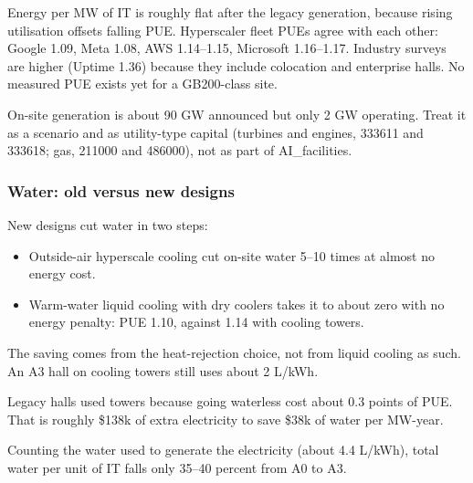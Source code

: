 Energy per MW of IT is roughly flat after the legacy generation, because rising utilisation
offsets falling PUE. Hyperscaler fleet PUEs agree with each other: Google 1.09, Meta 1.08, AWS
1.14--1.15, Microsoft 1.16--1.17. Industry surveys are higher (Uptime 1.36) because they include
colocation and enterprise halls. No measured PUE exists yet for a GB200-class site.

On-site generation is about 90 GW announced but only 2 GW operating. Treat it as a scenario and
as utility-type capital (turbines and engines, 333611 and 333618; gas, 211000 and 486000), not
as part of AI\_facilities.

\subsubsection{Water: old versus new designs}

\begin{table}[ht]\centering\small
\caption{Water per MW of IT load}\label{tab:water}
\end{table}

New designs cut water in two steps:
\begin{itemize}
  \item Outside-air hyperscale cooling cut on-site water 5--10 times at almost no energy cost.
  \item Warm-water liquid cooling with dry coolers takes it to about zero with no energy
    penalty: PUE 1.10, against 1.14 with cooling towers.
\end{itemize}
The saving comes from the heat-rejection choice, not from liquid cooling as such. An A3 hall on
cooling towers still uses about 2 L/kWh.

Legacy halls used towers because going waterless cost about 0.3 points of PUE. That is roughly
\$138k of extra electricity to save \$38k of water per MW-year.

Counting the water used to generate the electricity (about 4.4 L/kWh), total water per unit of
IT falls only 35--40 percent from A0 to A3.

